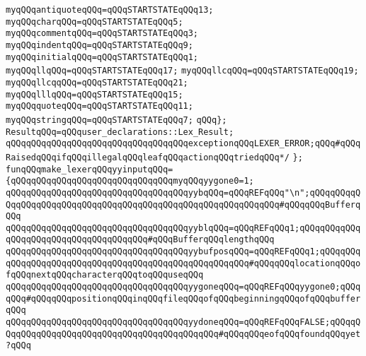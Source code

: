 \verb|myqQQqantiquoteqQQq=qQQqSTARTSTATEqQQq13;|\newline
\verb|myqQQqcharqQQq=qQQqSTARTSTATEqQQq5;|\newline
\verb|myqQQqcommentqQQq=qQQqSTARTSTATEqQQq3;|\newline
\verb|myqQQqindentqQQq=qQQqSTARTSTATEqQQq9;|\newline
\verb|myqQQqinitialqQQq=qQQqSTARTSTATEqQQq1;|\newline
\verb|myqQQqllqQQq=qQQqSTARTSTATEqQQq17;|\newline
\verb|myqQQqllcqQQq=qQQqSTARTSTATEqQQq19;|\newline
\verb|myqQQqllcqqQQq=qQQqSTARTSTATEqQQq21;|\newline
\verb|myqQQqlllqQQq=qQQqSTARTSTATEqQQq15;|\newline
\verb|myqQQqquoteqQQq=qQQqSTARTSTATEqQQq11;|\newline
\verb|myqQQqstringqQQq=qQQqSTARTSTATEqQQq7;|\newline
\newline
\verb|qQQq};|\newline
\verb|ResultqQQq=qQQquser_declarations::Lex_Result;|\newline
\verb|qQQqqQQqqQQqqQQqqQQqqQQqqQQqqQQqqQQqexceptionqQQqLEXER_ERROR;qQQq#qQQqRaisedqQQqifqQQqillegalqQQqleafqQQqactionqQQqtriedqQQq*/|\newline
\verb|};|\newline
\newline
\verb|funqQQqmake_lexerqQQqyyinputqQQq=|\newline
\verb|{qQQqqQQqqQQqqQQqqQQqqQQqqQQqqQQqmyqQQqyygone0=1;|\newline
\verb|qQQqqQQqqQQqqQQqqQQqqQQqqQQqqQQqqQQqyybqQQq=qQQqREFqQQq"\n";qQQqqQQqqQQqqQQqqQQqqQQqqQQqqQQqqQQqqQQqqQQqqQQqqQQqqQQqqQQqqQQq#qQQqqQQqBufferqQQq|\newline
\verb|qQQqqQQqqQQqqQQqqQQqqQQqqQQqqQQqqQQqyyblqQQq=qQQqREFqQQq1;qQQqqQQqqQQqqQQqqQQqqQQqqQQqqQQqqQQqqQQq#qQQqBufferqQQqlengthqQQq|\newline
\verb|qQQqqQQqqQQqqQQqqQQqqQQqqQQqqQQqqQQqyybufposqQQq=qQQqREFqQQq1;qQQqqQQqqQQqqQQqqQQqqQQqqQQqqQQqqQQqqQQqqQQqqQQqqQQqqQQq#qQQqqQQqlocationqQQqofqQQqnextqQQqcharacterqQQqtoqQQquseqQQq|\newline
\verb|qQQqqQQqqQQqqQQqqQQqqQQqqQQqqQQqqQQqyygoneqQQq=qQQqREFqQQqyygone0;qQQqqQQq#qQQqqQQqpositionqQQqinqQQqfileqQQqofqQQqbeginningqQQqofqQQqbufferqQQq|\newline
\verb|qQQqqQQqqQQqqQQqqQQqqQQqqQQqqQQqqQQqyydoneqQQq=qQQqREFqQQqFALSE;qQQqqQQqqQQqqQQqqQQqqQQqqQQqqQQqqQQqqQQqqQQqqQQq#qQQqqQQqeofqQQqfoundqQQqyet?qQQq|\newline
